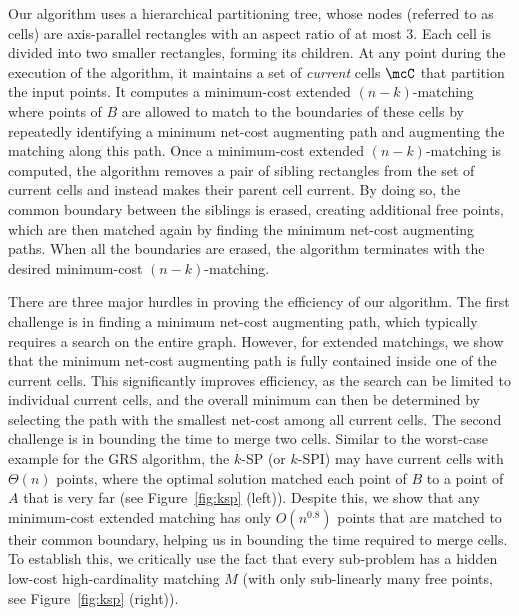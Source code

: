
Our algorithm uses a hierarchical partitioning tree, whose nodes (referred to as cells) are axis-parallel rectangles with an aspect ratio of at most $3$. Each cell is divided into two smaller rectangles, forming its children. At any point during the execution of the algorithm, it maintains a set of \emph{current} cells $\mcC$ that partition the input points. It computes a minimum-cost extended $(n-k)$-matching where points of $B$ are allowed to match to the boundaries of these cells by repeatedly identifying a minimum net-cost augmenting path and augmenting the matching along this path.  Once a minimum-cost extended $(n-k)$-matching is computed, the algorithm removes a pair of sibling rectangles from the set of current cells and instead makes their parent cell current. By doing so, the common boundary between the siblings is erased, creating additional free points, which are then matched again by finding the minimum net-cost augmenting paths. When all the boundaries are erased, the algorithm terminates with the desired minimum-cost $(n-k)$-matching. 

There are three major hurdles in proving the efficiency of our algorithm. The first challenge is in finding a minimum net-cost augmenting path, which typically requires a search on the entire graph. However, for extended matchings, we show that the minimum net-cost augmenting path is fully contained inside one of the current cells.  This significantly improves efficiency, as the search can be limited to individual current cells, and the overall minimum can then be determined by selecting the path with the smallest net-cost among all current cells.
The second challenge is in bounding the time to merge two cells. Similar to the worst-case example for the GRS algorithm, the $k$-SP (or $k$-SPI) may have current cells with $\Theta(n)$ points, where the optimal solution matched each point of $B$ to a point of $A$ that is very far (see Figure~\ref{fig:ksp} (left)). Despite this, we show that any minimum-cost extended matching has only $O(n^{0.8})$ points that are matched to their common boundary, helping us in bounding the time required to merge cells. To establish this, we critically use the fact that every sub-problem has a hidden low-cost high-cardinality matching $M$ (with only sub-linearly many free points, see Figure~\ref{fig:ksp} (right)). 

